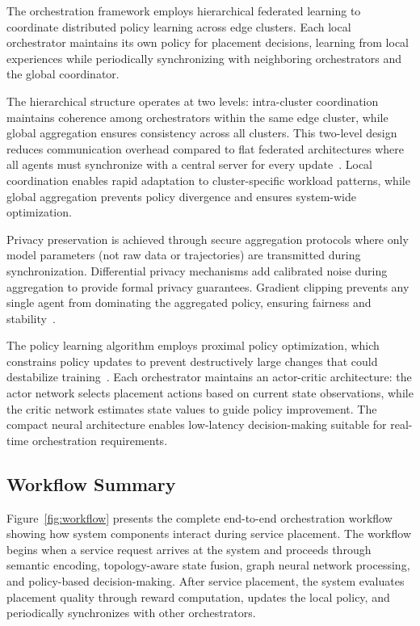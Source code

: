 \documentclass[conference]{IEEEtran}
\begin{document}
		The orchestration framework employs hierarchical federated learning to coordinate distributed policy learning across edge clusters. Each local orchestrator maintains its own policy for placement decisions, learning from local experiences while periodically synchronizing with neighboring orchestrators and the global coordinator.
		
		The hierarchical structure operates at two levels: intra-cluster coordination maintains coherence among orchestrators within the same edge cluster, while global aggregation ensures consistency across all clusters. This two-level design reduces communication overhead compared to flat federated architectures where all agents must synchronize with a central server for every update~\cite{sad2024fearless, yan2023v2v}. Local coordination enables rapid adaptation to cluster-specific workload patterns, while global aggregation prevents policy divergence and ensures system-wide optimization.
		
		Privacy preservation is achieved through secure aggregation protocols where only model parameters (not raw data or trajectories) are transmitted during synchronization. Differential privacy mechanisms add calibrated noise during aggregation to provide formal privacy guarantees. Gradient clipping prevents any single agent from dominating the aggregated policy, ensuring fairness and stability~\cite{mao2024optimizing, li2021network}.
		
		The policy learning algorithm employs proximal policy optimization, which constrains policy updates to prevent destructively large changes that could destabilize training~\cite{singh2024drl, kianpisheh2024}. Each orchestrator maintains an actor-critic architecture: the actor network selects placement actions based on current state observations, while the critic network estimates state values to guide policy improvement. The compact neural architecture enables low-latency decision-making suitable for real-time orchestration requirements.
		
		\subsection{Workflow Summary}
		\label{subsec:workflow}
		
		Figure~\ref{fig:workflow} presents the complete end-to-end orchestration workflow showing how system components interact during service placement. The workflow begins when a service request arrives at the system and proceeds through semantic encoding, topology-aware state fusion, graph neural network processing, and policy-based decision-making. After service placement, the system evaluates placement quality through reward computation, updates the local policy, and periodically synchronizes with other orchestrators.
		
\end{document}
